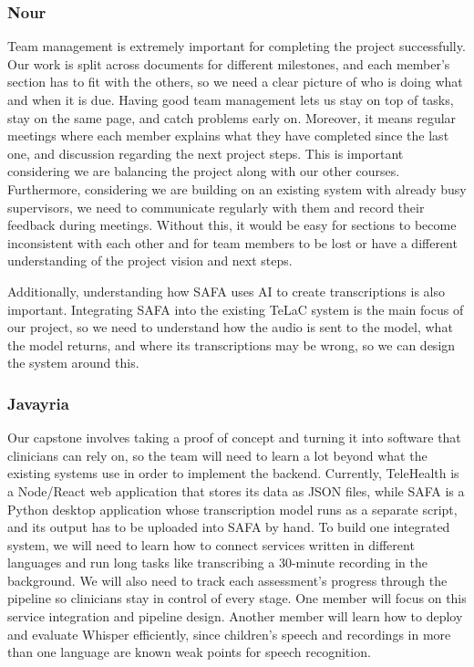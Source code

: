 \documentclass[12pt]{article}
\begin{document}
\subsubsection*{Nour}
Team management is extremely important for completing the project successfully. 
Our work is split across documents for different milestones, and each member’s section has to fit with the others, so we need a clear picture of who is doing what and when it is due. 
Having good team management lets us stay on top of tasks, stay on the same page, and catch problems early on. 
Moreover, it means regular meetings where each member explains what they have completed since the last one, and discussion regarding the next project steps. 
This is important considering we are balancing the project along with our other courses. 
Furthermore, considering we are building on an existing system with already busy supervisors, we need to communicate regularly with them and record their feedback during meetings. 
Without this, it would be easy for sections to become inconsistent with each other and for team members to be lost or have a different understanding of the project vision and next steps.

Additionally, understanding how SAFA uses AI to create transcriptions is also important. 
Integrating SAFA into the existing TeLaC system is the main focus of our project, so we need to understand how the audio is sent to the model, what the model returns, and where its transcriptions may be wrong, so we can design the system around this.

\subsubsection*{Javayria}
Our capstone involves taking a proof of concept and turning it into software that clinicians can rely on, so the team will need to learn a lot beyond what the existing systems use in order to implement the backend. Currently, TeleHealth is a Node/React web application that stores its data as JSON files, while SAFA is a Python desktop application whose transcription model runs as a separate script, and its output has to be uploaded into SAFA by hand. To build one integrated system, we will need to learn how to connect services written in different languages and run long tasks like transcribing a 30-minute recording in the background. We will also need to track each assessment's progress through the pipeline so clinicians stay in control of every stage. One member will focus on this service integration and pipeline design. Another member will learn how to deploy and evaluate Whisper efficiently, since children's speech and recordings in more than one language are known weak points for speech recognition.
\end{document}

